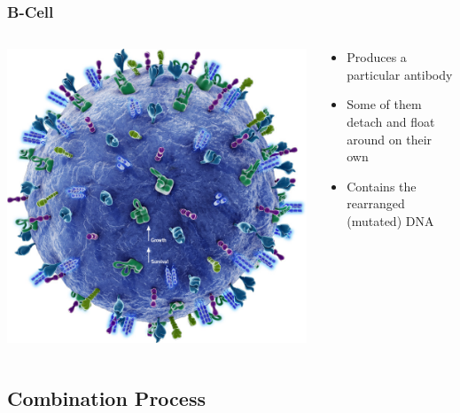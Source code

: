 \documentclass{beamer}
\begin{document}
\begin{frame}
\frametitle{B-Cell}
\begin{columns}
  \begin{column}{.5\textwidth} 
    \includegraphics[width=\textwidth]{b-cell.jpg}
  \end{column}
  \begin{column}{.5\textwidth} 
    \begin{itemize}
     \item Produces a particular antibody
     \item Some of them detach and float around on their own
     \item Contains the rearranged (mutated) DNA
    \end{itemize}
  \end{column}
\end{columns}
\end{frame}

\subsection{Combination Process}
\end{document}
